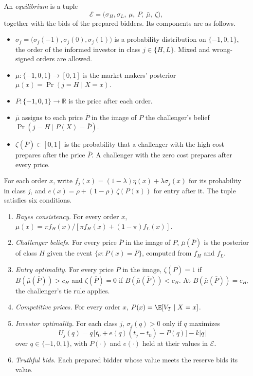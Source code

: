 \begin{definition}[Equilibrium]\label{def:equilibrium}
An \emph{equilibrium} is a tuple
\[
\mathcal{E}=\bigl(\sigma_H,\sigma_L,\ \mu,\ P,\ \bar\mu,\ \zeta\bigr),
\]
together with the bids of the prepared bidders. Its components are as follows.
\begin{itemize}[leftmargin=2em]
\item \(\sigma_j=\bigl(\sigma_j(-1),\sigma_j(0),\sigma_j(1)\bigr)\) is a probability distribution on
\(\{-1,0,1\}\), the order of the informed investor in class \(j\in\{H,L\}\). Mixed and wrong-signed orders are
allowed.
\item \(\mu:\{-1,0,1\}\to[0,1]\) is the market makers' posterior \(\mu(x)=\Pr(j=H\mid X=x)\).
\item \(P:\{-1,0,1\}\to\mathbb{R}\) is the price after each order.
\item \(\bar\mu\) assigns to each price \(\bar P\) in the image of \(P\) the challenger's belief
\(\Pr(j=H\mid P(X)=\bar P)\).
\item \(\zeta(\bar P)\in[0,1]\) is the probability that a challenger with the high cost prepares after the price
\(\bar P\). A challenger with the zero cost prepares after every price.
\end{itemize}
For each order \(x\), write \(f_j(x)=(1-\lambda)\eta(x)+\lambda\sigma_j(x)\) for its probability in class
\(j\), and \(e(x)=\rho+(1-\rho)\,\zeta(P(x))\) for entry after it. The tuple satisfies six conditions.
\begin{enumerate}[label=(E\arabic*),leftmargin=3em]
\item \emph{Bayes consistency.} For every order \(x\),
\(\mu(x)=\pi f_H(x)/[\pi f_H(x)+(1-\pi)f_L(x)]\).
\item \emph{Challenger beliefs.} For every price \(\bar P\) in the image of \(P\), \(\bar\mu(\bar P)\) is the
posterior of class \(H\) given the event \(\{x:P(x)=\bar P\}\), computed from \(f_H\) and \(f_L\).
\item \emph{Entry optimality.} For every price \(\bar P\) in the image, \(\zeta(\bar P)=1\) if
\(B(\bar\mu(\bar P))>c_H\) and \(\zeta(\bar P)=0\) if \(B(\bar\mu(\bar P))<c_H\). At
\(B(\bar\mu(\bar P))=c_H\), the challenger's tie rule applies.
\item \emph{Competitive prices.} For every order \(x\), \(P(x)=\E[V_T\mid X=x]\).
\item \emph{Investor optimality.} For each class \(j\), \(\sigma_j(q)>0\) only if \(q\) maximizes
\[
U_j(q)=q\,\bigl[t_0+e(q)(t_j-t_0)-P(q)\bigr]-k|q|
\]
over \(q\in\{-1,0,1\}\), with \(P(\cdot)\) and \(e(\cdot)\) held at their values in \(\mathcal{E}\).
\item \emph{Truthful bids.} Each prepared bidder whose value meets the reserve bids its value.
\end{enumerate}
\end{definition}

